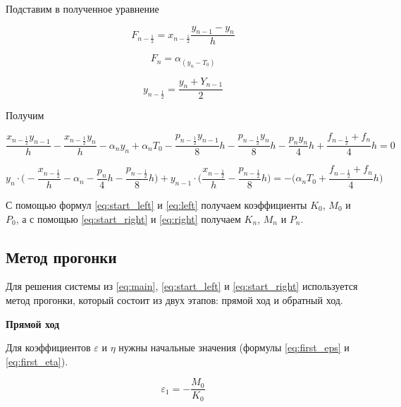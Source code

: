 Подставим в полученное уравнение

\begin{equation*}
    F_{n-\frac{1}{2}} = x_{n-\frac{1}{2}} \frac{y_{n-1} - y_n}{h}
\end{equation*}

\begin{equation*}
    F_n = \alpha_(y_n-T_0)
\end{equation*}

\begin{equation*}
    y_{n-\frac{1}{2}} = \frac{y_n + Y_{n-1}}{2}
\end{equation*}

Получим

\begin{equation*}
    \frac{x_{n-\frac{1}{2}} y_{n-1}}{h} -
    \frac{x_{n-\frac{1}{2}} y_{n}}{h} -
    \alpha_ny_n +
    \alpha_nT_0 -
    \frac{p_{n-\frac{1}{2}} y_{n-1}}{8}h -
    \frac{p_{n-\frac{1}{2}} y_{n}}{8}h -
    \frac{p_{n}y_{n}}{4}h +
    \frac{f_{n-\frac{1}{2}} + f_n}{4}h = 0
\end{equation*}

\begin{equation}\label{eq:right}
    y_n \cdot \bigg( -\frac{x_{n-\frac{1}{2}}}{h} - \alpha_n -
    \frac{p_n}{4}h - \frac{p_{n-\frac{1}{2}}}{8} h \bigg) +
    y_{n-1} \cdot \bigg( \frac{x_{n-\frac{1}{2}}}{h} -
    \frac{p_{n-\frac{1}{2}}}{8} h \bigg) = - \bigg(
    \alpha_nT_0 + \frac{f_{n-\frac{1}{2}} + f_n}{4} h \bigg)
\end{equation}

С помощью формул \ref{eq:start_left} и \ref{eq:left} получаем коэффициенты
$K_0$, $M_0$ и $P_0$, а с помощью \ref{eq:start_right} и \ref{eq:right} получаем
$K_n$, $M_n$ и $P_n$.

\subsection{Метод прогонки}

Для решения системы из \ref{eq:main}, \ref{eq:start_left} и \ref{eq:start_right}
используется метод прогонки, который состоит из двух этапов: прямой ход и
обратный ход.

\textbf{Прямой ход}

Для коэффициентов $\varepsilon$ и $\eta$ нужны начальные значения
(формулы \ref{eq:first_eps} и \ref{eq:first_eta}).

\begin{equation}\label{eq:first_eps}
    \varepsilon_1 = -\frac{M_0}{K_0}
\end{equation}

